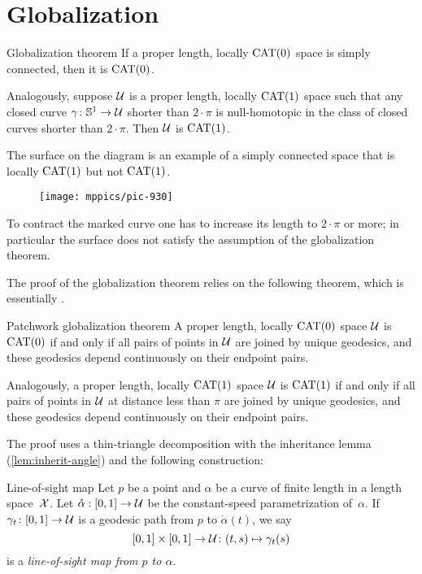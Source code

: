 \section{Globalization}\label{sec:Hadamard--Cartan}



\begin{thm}{Globalization theorem}
\label{thm:hadamard-cartan}
If a proper length, locally $\mathrm{CAT}(0)$ space is simply connected, then it 
is $\mathrm{CAT}(0)$.

Analogously, suppose $\mathcal{U}$ is a proper length, locally $\mathrm{CAT}(1)$ space
such that any closed curve $\gamma\colon\mathbb{S}^1\to \mathcal{U}$ shorter than $2\cdot\pi$
is null-homotopic in the class of closed curves shorter than $2\cdot\pi$.
Then $\mathcal{U}$ is $\mathrm{CAT}(1)$.
\end{thm}


The surface on the diagram 
is an example of a simply connected space that  is locally $\mathrm{CAT}(1)$ but not $\mathrm{CAT}(1)$.
\begin{figure}[h!]
\vskip0mm
\centering
\texttt{[image: mppics/pic-930]}
\end{figure}
To contract the marked curve one has to increase its length to $2\cdot\pi$ or more;
in particular the surface does not satisfy the assumption of the globalization theorem.


The proof of the globalization theorem relies on the following theorem, 
which is essentially  \cite[Satz 9]{alexandrov-1957}.  

\begin{thm}{Patchwork globalization theorem}\label{thm:alex-patch}
A proper length, locally $\mathrm{CAT}(0)$ space $\mathcal{U}$ is $\mathrm{CAT}(0)$
if and only if all pairs of points in $\mathcal{U}$  are joined by unique geodesics, and these geodesics depend continuously on their endpoint pairs.

Analogously, a proper length, locally $\mathrm{CAT}(1)$ space $\mathcal{U}$ is $\mathrm{CAT}(1)$ 
if and only if all pairs of points in $\mathcal{U}$ at distance less than $\pi$ are joined by unique geodesics, and these geodesics depend continuously on their endpoint pairs.
\end{thm}

The proof uses a thin-triangle decomposition with the inheritance lemma (\ref{lem:inherit-angle}) and the following construction:

\begin{thm}{Line-of-sight map} \label{def:sight}
Let  $p$ be a point and $\alpha$ be a curve of finite length in  a length space~$\mathcal{X}$. 
Let $\mathring\alpha:[0,1]\to\mathcal{U}$ be the constant-speed parametrization of~$\alpha$.  
If   $\gamma_t\colon[0,1]\to\mathcal{U}$ is a geodesic path from $p$ to $\mathring\alpha(t)$, we say 
\[
[0,1]\times[0,1]\to\mathcal{U}\colon(t,s)\mapsto\gamma_t(s)
\]
is a \emph{line-of-sight map from $p$ to $\alpha$}.  
\end{thm}

